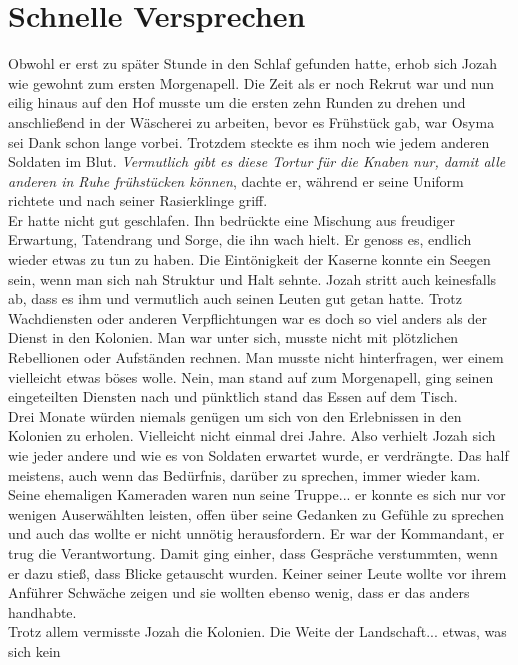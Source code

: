 \chapter{Schnelle Versprechen}


Obwohl er erst zu später Stunde in den Schlaf gefunden hatte, erhob sich Jozah wie gewohnt zum 
ersten Morgenapell. Die Zeit als er noch Rekrut war und nun eilig hinaus auf den Hof musste um die 
ersten zehn Runden zu drehen und anschließend in der Wäscherei zu arbeiten, bevor es Frühstück gab, 
war Osyma sei Dank schon lange vorbei. Trotzdem steckte es ihm noch wie jedem anderen Soldaten im 
Blut. \textit{Vermutlich gibt es diese Tortur für die Knaben nur, damit alle anderen in Ruhe 
frühstücken können}, dachte er, während er seine Uniform richtete und nach seiner Rasierklinge 
griff.\\
Er hatte nicht gut geschlafen. Ihn bedrückte eine Mischung aus freudiger Erwartung, Tatendrang und 
Sorge, die ihn wach hielt. Er genoss es, endlich wieder etwas zu tun zu haben. Die Eintönigkeit der 
Kaserne konnte ein Seegen sein, wenn man sich nah Struktur und Halt sehnte. Jozah stritt auch 
keinesfalls ab, dass es ihm und vermutlich auch seinen Leuten gut getan hatte. Trotz Wachdiensten 
oder anderen Verpflichtungen war es doch so viel anders als der Dienst in den Kolonien. Man war 
unter sich, musste nicht mit plötzlichen Rebellionen oder Aufständen rechnen. Man musste nicht 
hinterfragen, wer einem vielleicht etwas böses wolle. Nein, man stand auf zum Morgenapell, ging 
seinen eingeteilten Diensten nach und pünktlich stand das Essen auf dem Tisch. \\
Drei Monate würden niemals genügen um sich von den Erlebnissen in den Kolonien zu erholen. 
Vielleicht nicht einmal drei Jahre. Also verhielt Jozah sich wie jeder andere und wie es von 
Soldaten erwartet wurde, er verdrängte. Das half meistens, auch wenn das Bedürfnis, darüber zu 
sprechen, immer wieder kam. Seine ehemaligen Kameraden waren nun seine Truppe... er konnte es sich 
nur vor wenigen Auserwählten leisten, offen über seine Gedanken zu Gefühle zu sprechen und auch das 
wollte er nicht unnötig herausfordern. Er war der Kommandant, er trug die Verantwortung. Damit ging 
einher, dass Gespräche verstummten, wenn er dazu stieß, dass Blicke getauscht wurden. Keiner seiner 
Leute wollte vor ihrem Anführer Schwäche zeigen und sie wollten ebenso wenig, dass er das anders 
handhabte. \\
Trotz allem vermisste Jozah die Kolonien. Die Weite der Landschaft... etwas, was sich kein 
